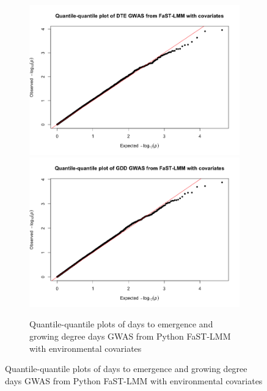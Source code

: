 \documentclass{article}
\begin{document}
\begin{figure}[!htb]
\centering
	\begin{subfigure}{\textwidth}
	\centering
		\includegraphics[scale=.25]{qqplot_fastlmm_dte_wcov.png}
		\includegraphics[scale=.25]{qqplot_fastlmm_gdd_wcov.png}
		\caption{Quantile-quantile plots of days to emergence and growing degree days GWAS from Python FaST-LMM with environmental covariates}
		\label{fig2:subfig1}
	\end{subfigure}
	

\end{figure}
\end{document}
